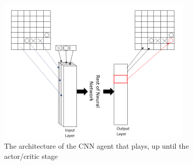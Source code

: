 \begin{figure}
	\centering
	\includegraphics[width = \columnwidth, height = 70mm]{Assets/NetworkArchitecture3}
	\caption{The architecture of the CNN agent that plays, up until the actor/critic stage
    }
    \vspace{-4mm}
\label{fig:networkArchitecture}
\end{figure}